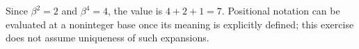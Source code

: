 Since $\beta^2=2$ and $\beta^4=4$, the value is $4+2+1=\boxed7$. Positional notation can be evaluated at a noninteger base once its meaning is explicitly defined; this exercise does not assume uniqueness of such expansions.
